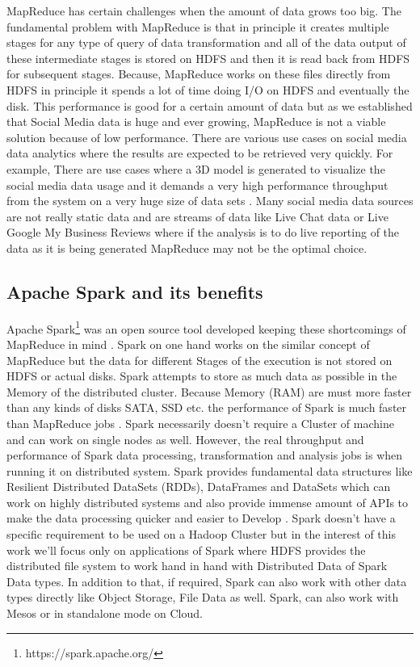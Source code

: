 \documentclass[sigconf]{acmart}
\begin{document}
MapReduce has certain challenges when the amount of data grows too big. The fundamental problem with MapReduce is that in principle it creates multiple stages for any type of query of data transformation and all of the data output of these intermediate stages is stored on HDFS and then it is read back from HDFS for subsequent stages. Because, MapReduce works on these files directly from HDFS in principle it spends a lot of time doing I/O on HDFS and eventually the disk. This performance is good for a certain amount of data but as we established that Social Media data is huge and ever growing, MapReduce is not a viable solution because of low performance. There are various use cases on social media data analytics where the results are expected to be retrieved very quickly. For example, There are use cases where a 3D model is generated to visualize the social media data usage  and it demands a very high performance throughput from the system on a very huge size of data sets  \cite{3dvisual}. Many social media data sources are not really static data and are streams of data like Live Chat data or Live Google My Business Reviews where if the analysis is to do live reporting of the data as it is being generated MapReduce may not be the optimal choice.
\subsection{Apache Spark and its benefits}
Apache Spark\footnote{https://spark.apache.org/} was an open source tool developed keeping these shortcomings of MapReduce in mind  \cite{sparkvsmapr}. Spark on one hand works on the similar concept of MapReduce but the data for different Stages of the execution is not stored on HDFS or actual disks. Spark attempts to store as much data as possible in the Memory of the distributed cluster. Because Memory (RAM) are must more faster than any kinds of disks SATA, SSD etc. the performance of Spark is much faster than MapReduce jobs  \cite{sparkvsmapr}. Spark necessarily doesn't require a Cluster of machine and can work on single nodes as well. However, the real throughput and performance of Spark data processing, transformation and analysis jobs is when running it on distributed system. Spark provides fundamental data structures like Resilient Distributed DataSets (RDDs), DataFrames and DataSets which can work on highly distributed systems and also provide immense amount of APIs to make the data processing quicker and easier to Develop  \cite{sparkrdddfds}. Spark doesn't have a specific requirement to be used on a Hadoop Cluster but in the interest of this work we'll focus only on applications of Spark where HDFS provides the distributed file system to work hand in hand with Distributed Data of Spark Data types. In addition to that, if required, Spark can also work with other data types directly like Object Storage, File Data as well. Spark, can also work with Mesos or in standalone mode on Cloud.
\end{document}
